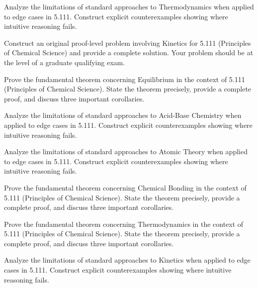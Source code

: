 \documentclass[12pt,a4paper]{exam}
\begin{document}
\begin{questions}
\vspace{0.3cm}

\question[2]
Analyze the limitations of standard approaches to Thermodynamics when applied to edge cases in 5.111. Construct explicit counterexamples showing where intuitive reasoning fails.

\vspace{0.3cm}

\question[3]
Construct an original proof-level problem involving Kinetics for 5.111 (Principles of Chemical Science) and provide a complete solution. Your problem should be at the level of a graduate qualifying exam.

\vspace{0.3cm}

\question[5]
Prove the fundamental theorem concerning Equilibrium in the context of 5.111 (Principles of Chemical Science). State the theorem precisely, provide a complete proof, and discuss three important corollaries.

\vspace{0.3cm}

\question[5]
Analyze the limitations of standard approaches to Acid-Base Chemistry when applied to edge cases in 5.111. Construct explicit counterexamples showing where intuitive reasoning fails.

\vspace{0.3cm}

\question[6]
Analyze the limitations of standard approaches to Atomic Theory when applied to edge cases in 5.111. Construct explicit counterexamples showing where intuitive reasoning fails.

\vspace{0.3cm}

\question[5]
Prove the fundamental theorem concerning Chemical Bonding in the context of 5.111 (Principles of Chemical Science). State the theorem precisely, provide a complete proof, and discuss three important corollaries.

\vspace{0.3cm}

\question[4]
Prove the fundamental theorem concerning Thermodynamics in the context of 5.111 (Principles of Chemical Science). State the theorem precisely, provide a complete proof, and discuss three important corollaries.

\vspace{0.3cm}

\question[2]
Analyze the limitations of standard approaches to Kinetics when applied to edge cases in 5.111. Construct explicit counterexamples showing where intuitive reasoning fails.


\end{questions}
\end{document}
